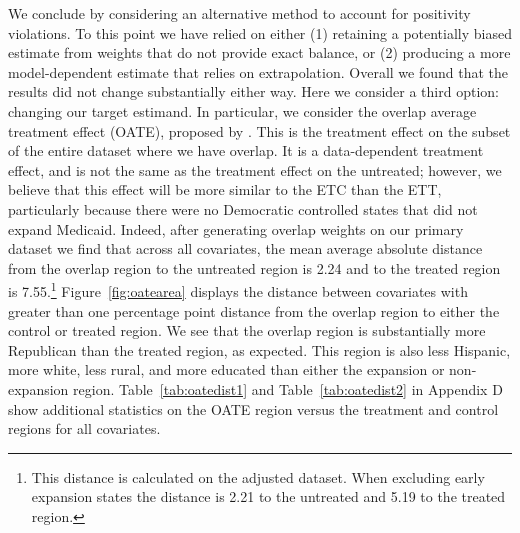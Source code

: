 \documentclass[aoas]{imsart}
\theoremstyle{plain}
\theoremstyle{remark}
\begin{document}
We conclude by considering an alternative method to account for positivity violations. To this point we have relied on either (1) retaining a potentially biased estimate from weights that do not provide exact balance, or (2) producing a more model-dependent estimate that relies on extrapolation. Overall we found that the results did not change substantially either way. Here we consider a third option: changing our target estimand. In particular, we consider the overlap average treatment effect (OATE), proposed by \cite{li2018balancing}. This is the treatment effect on the subset of the entire dataset where we have overlap. It is a data-dependent treatment effect, and is not the same as the treatment effect on the untreated; however, we believe that this effect will be more similar to the ETC than the ETT, particularly because there were no Democratic controlled states that did not expand Medicaid. Indeed, after generating overlap weights on our primary dataset we find that across all covariates, the mean average absolute distance from the overlap region to the untreated region is 2.24 and to the treated region is 7.55.\footnote{This distance is calculated on the adjusted dataset. When excluding early expansion states the distance is 2.21 to the untreated and 5.19 to the treated region.} Figure~\ref{fig:oatearea} displays the distance between covariates with greater than one percentage point distance from the overlap region to either the control or treated region. We see that the overlap region is substantially more Republican than the treated region, as expected. This region is also less Hispanic, more white, less rural, and more educated than either the expansion or non-expansion region. Table~\ref{tab:oatedist1} and Table~\ref{tab:oatedist2} in Appendix D show additional statistics on the OATE region versus the treatment and control regions for all covariates.
\end{document}

